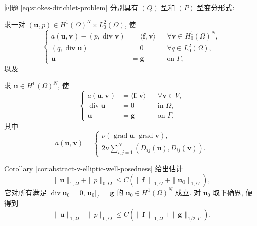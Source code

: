 \setcounter{statement}{1}
\begin{Remark}\label{rem:stokes-dirichlet-variational-formulations}
问题 \eqref{eq:stokes-dirichlet-problem} 分别具有 $(Q)$ 型和 $(P)$ 型变分形式:

求一对
$(\mathbf{u},p)\in H^1(\Omega)^N\times L_0^2(\Omega)$, 使
\begin{equation}\label{eq:stokes-dirichlet-q-formulation}
\left\{
\begin{aligned}
a(\mathbf{u},\mathbf{v})
-(p,\operatorname{div}\mathbf{v})
&=\langle\mathbf{f},\mathbf{v}\rangle
&&\forall\mathbf{v}\in H_0^1(\Omega)^N,\\
(q,\operatorname{div}\mathbf{u})&=0
&&\forall q\in L_0^2(\Omega),\\
\mathbf{u}&=\mathbf{g}
&&\text{on }\Gamma,
\end{aligned}
\right.
\end{equation}
以及

求 $\mathbf{u}\in H^1(\Omega)^N$, 使
\begin{equation}\label{eq:stokes-dirichlet-p-formulation}
\left\{
\begin{aligned}
a(\mathbf{u},\mathbf{v})
&=\langle\mathbf{f},\mathbf{v}\rangle
&&\forall\mathbf{v}\in V,\\
\operatorname{div}\mathbf{u}&=0
&&\text{in }\Omega,\\
\mathbf{u}&=\mathbf{g}
&&\text{on }\Gamma,
\end{aligned}
\right.
\end{equation}
其中
\[
a(\mathbf{u},\mathbf{v})
=
\left\{
\begin{aligned}
\nu(\operatorname{grad}\mathbf{u},
\operatorname{grad}\mathbf{v}),\\
2\nu\sum_{i,j=1}^{N}
(D_{ij}(\mathbf{u}),D_{ij}(\mathbf{v})).
\end{aligned}
\right.
\]
\end{Remark}

\setcounter{statement}{2}
\begin{Remark}\label{rem:stokes-dirichlet-apriori-bound}
Corollary \ref{cor:abstract-v-elliptic-well-posedness} 给出估计
\[
\|\mathbf{u}\|_{1,\Omega}+\|p\|_{0,\Omega}
\le C(\|\mathbf{f}\|_{-1,\Omega}
+\|\mathbf{u}_0\|_{1,\Omega}),
\]
它对所有满足
$\operatorname{div}\mathbf{u}_0=0$,
$\mathbf{u}_0|_\Gamma=\mathbf{g}$ 的
$\mathbf{u}_0\in H^1(\Omega)^N$ 成立. 对 $\mathbf{u}_0$ 取下确界,
便得到
\[
\|\mathbf{u}\|_{1,\Omega}+\|p\|_{0,\Omega}
\le C(\|\mathbf{f}\|_{-1,\Omega}
+\|\mathbf{g}\|_{1/2,\Gamma}).
\]
\end{Remark}

